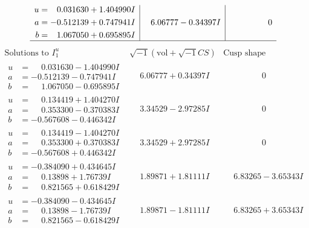\documentclass[1p]{elsarticle_modified}
\theoremstyle{definition}
\newcommand{\I}{\sqrt{-1}}
\begin{document}
$$\begin{array}{c|c|c}
\begin{aligned}
u &= \phantom{-}0.031630 + 1.404990 I \\
a &= -0.512139 + 0.747941 I \\
b &= \phantom{-}1.067050 + 0.695895 I\end{aligned}
 & \phantom{-}6.06777 - 0.34397 I & \phantom{-0.000000 } 0\\
 \hline 
 \end{array}$$\newpage$$\begin{array}{c|c|c}  
\text{Solutions to }I^u_{1}& \I (\text{vol} + \sqrt{-1}CS) & \text{Cusp shape}\\
 \hline 
\begin{aligned}
u &= \phantom{-}0.031630 - 1.404990 I \\
a &= -0.512139 - 0.747941 I \\
b &= \phantom{-}1.067050 - 0.695895 I\end{aligned}
 & \phantom{-}6.06777 + 0.34397 I & \phantom{-0.000000 } 0 \\ \hline\begin{aligned}
u &= \phantom{-}0.134419 + 1.404270 I \\
a &= \phantom{-}0.353300 - 0.370383 I \\
b &= -0.567608 - 0.446342 I\end{aligned}
 & \phantom{-}3.34529 - 2.97285 I & \phantom{-0.000000 } 0 \\ \hline\begin{aligned}
u &= \phantom{-}0.134419 - 1.404270 I \\
a &= \phantom{-}0.353300 + 0.370383 I \\
b &= -0.567608 + 0.446342 I\end{aligned}
 & \phantom{-}3.34529 + 2.97285 I & \phantom{-0.000000 } 0 \\ \hline\begin{aligned}
u &= -0.384090 + 0.434645 I \\
a &= \phantom{-}0.13898 + 1.76739 I \\
b &= \phantom{-}0.821565 + 0.618429 I\end{aligned}
 & \phantom{-}1.89871 + 1.81111 I & \phantom{-}6.83265 - 3.65343 I \\ \hline\begin{aligned}
u &= -0.384090 - 0.434645 I \\
a &= \phantom{-}0.13898 - 1.76739 I \\
b &= \phantom{-}0.821565 - 0.618429 I\end{aligned}
 & \phantom{-}1.89871 - 1.81111 I & \phantom{-}6.83265 + 3.65343 I \\ \hline\begin{aligned}

\end{aligned}
\end{array}$$
\end{document}
